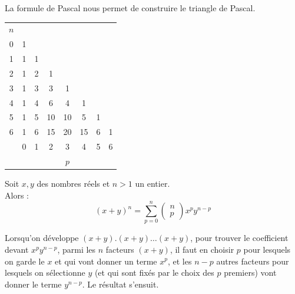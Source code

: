 \documentclass{book}
\begin{document}
\begin{Demonstration}
\begin{enumerate}
\end{enumerate}
La formule de Pascal nous permet de construire le triangle de Pascal.
\begin{center}
\begin{tabular}{c|ccccccc}
\multicolumn{1}{l}{$n$} &&&&&&&\\\cline{1-1} 
0 &1&&&&&&\\
1 &1&1&&&&&\\
2 &1&2&1&&&&\\
3 &1&3&3&1&&&\\
4 &1&4&6&4&1&&\\
5 &1&5&10&10&5&1&\\
6 &1&6&15&20&15&6&1\\\hline
\multicolumn{1}{l}{} &0&1&2&3&4&5&6\\\cline{2-8}
\multicolumn{1}{l}{} &\multicolumn{7}{c}{$p$}
\end{tabular}
\end{center}
\end{Demonstration}


\begin{Proposition} Soit $x, y$ des nombres réels et $n > 1$ un
entier. \\
Alors :
\[
(x+y)^n= \sum_{p=0}^n \begin{pmatrix}n\\p\end{pmatrix} x^p y^{n-p}
\]
\end{Proposition}
\begin{Demonstration} Lorsqu'on développe $(x+y).(x+y) \dots (x+y)$, pour trouver le coefficient
devant $x^p y^{n-p}$, parmi les $n$ facteurs $(x + y)$, il faut en choisir $p$ pour lesquels on garde le $x$ et
qui vont donner un terme $x^p$, et les $n - p$ autres facteurs pour lesquels on sélectionne $y$ (et qui
sont fixés par le choix des $p$ premiers) vont donner le terme $y^{n-p}$. Le résultat s'ensuit.
\end{Demonstration}
\end{document}
